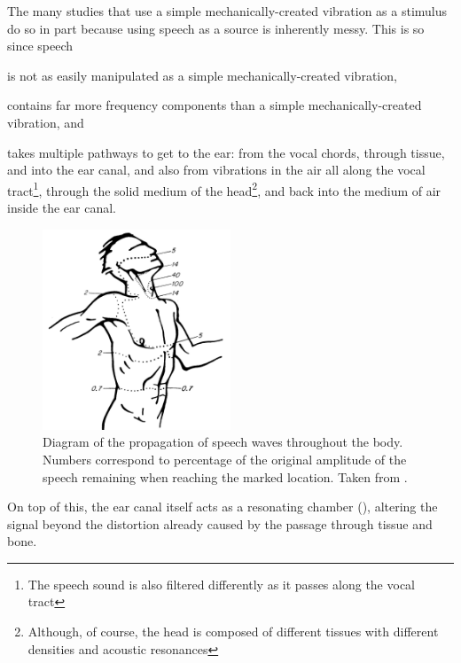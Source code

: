 \documentclass[dissertation,copyright]{uathesis}
\begin{document}
The many studies that use a simple mechanically-created vibration as a stimulus do so in part because using speech as a source is inherently messy.  This is so since speech 
\begin{enumerate*}[label={\alph*)}]
  \item  is not as easily manipulated as a simple mechanically-created vibration,
  \item  contains far more frequency components than a simple mechanically-created vibration, and 
  \item  takes multiple pathways to get to the ear: from the vocal chords, through tissue, and into the ear canal, and also from vibrations in the air all along the vocal tract\footnote{The speech sound is also filtered differently as it passes along the vocal tract}, through the solid medium of the head\footnote{Although, of course, the head is composed of different tissues with different densities and acoustic resonances}, and back into the medium of air inside the ear canal.
\end{enumerate*}
% 
\begin{figure}
\centering
  \includegraphics[width=0.5\textwidth]{figure/bekesy60-3b.png}
  \caption{Diagram of the propagation of speech waves throughout the body. Numbers correspond to percentage of the original amplitude of the speech remaining when reaching the marked location. Taken from \cite{bekesy:60}.}
  \label{fig:bekesyBodyTransfer}
\end{figure}
%
On top of this, the ear canal itself acts as a resonating chamber (\cite{rosen:91}), altering the signal beyond the distortion already caused by the passage through tissue and bone.  
\end{document}
